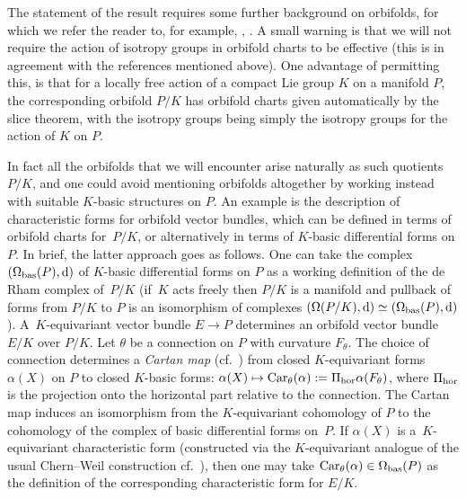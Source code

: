 \documentclass[11pt]{article}
\numberwithin{equation}{section}
\newcommand{\tn}[1]{\textnormal{#1}}
\begin{document}
The statement of the result requires some further background on orbifolds, for which we refer the reader to, for example, \cite[Appendix A]{daSilvaThesis}, \cite[Section 2]{MeinrenkenSymplecticSurgery}. A small warning is that we will not require the action of isotropy groups in orbifold charts to be effective (this is in agreement with the references \cite{daSilvaThesis,MeinrenkenSymplecticSurgery} mentioned above). One advantage of permitting this, is that for a locally free action of a compact Lie group $K$ on a manifold $P$, the corresponding orbifold $P/K$ has orbifold charts given automatically by the slice theorem, with the isotropy groups being simply the isotropy groups for the action of $K$ on $P$.

In fact all the orbifolds that we will encounter arise naturally as such quotients $P/K$, and one could avoid mentioning orbifolds altogether by working instead with suitable $K$-basic structures on $P$. An example is the description of characteristic forms for orbifold vector bundles, which can be defined in terms of orbifold charts for~$P/K$, or alternatively in terms of $K$-basic differential forms on $P$. In brief, the latter approach goes as follows. One can take the complex $(\Omega_{\tn{bas}}(P),{\rm d})$ of $K$-basic differential forms on $P$ as a working definition of the de Rham complex of~$P/K$ (if~$K$ acts freely then $P/K$ is a manifold and pullback of forms from $P/K$ to $P$ is an isomorphism of complexes $(\Omega(P/K),{\rm d})\simeq (\Omega_{\tn{bas}}(P),{\rm d})$). A~$K$-equivariant vector bundle $E \rightarrow P$ determines an orbifold vector bundle $E/K$ over $P/K$. Let $\theta$ be a connection on $P$ with curvature $F_\theta$. The choice of connection determines a \emph{Cartan map} (cf.~\cite{MeinrenkenEncyclopedia}) from closed $K$-equivariant forms $\alpha(X)$ on $P$ to closed $K$-basic forms: $\alpha(X) \mapsto \tn{Car}_\theta(\alpha):=\Pi_{\tn{hor}}\alpha(F_\theta)$, where $\Pi_{\tn{hor}}$ is the projection onto the horizontal part relative to the connection. The Cartan map induces an isomorphism from the $K$-equivariant cohomology of $P$ to the cohomology of the complex of basic differential forms on~$P$. If $\alpha(X)$ is a~$K$-equivariant characteristic form (constructed via the $K$-equivariant analogue of the usual Chern--Weil construction cf.~\cite{BerlineGetzlerVergne,MeinrenkenEncyclopedia}), then one may take $\tn{Car}_\theta(\alpha) \in \Omega_{\tn{bas}}(P)$ as the definition of the corresponding characteristic form for $E/K$.
\end{document}
